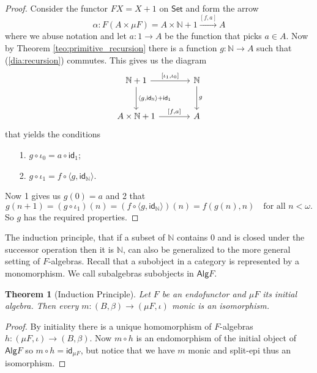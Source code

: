 \documentclass[letterpaper, 11pt, oneside]{memoir}
\theoremstyle{myteo}
\newtheorem{theorem}{Theorem}[section]
\numberwithin{equation}{section}
\newcommand{\id}{\textsf{id}}
\newcommand{\alg}{\textsf{Alg}}
\newcommand{\Set}{\textsf{Set}}
\newcommand{\N}{\mathbb{N}}
\newcommand{\outofcoprod}[2]{{[#1, #2]}}
\newcommand{\intoprod}[2]{{\langle #1, #2\rangle}}
\begin{document}
\begin{proof}
  Consider the functor \(FX = X + 1\) on \(\Set\) and form the arrow
  \begin{equation*}
    \alpha \colon F(A \times \mu F) = A \times \N + 1 \xrightarrow{\outofcoprod{f}{a}} A
  \end{equation*}
  where we abuse notation and let \(a : 1 \to A\) be the function that picks \(a \in A\).
  Now by Theorem \ref{teo:primitive_recursion} there is a function \(g \colon \N \to A\) such that (\ref{dia:recursion}) commutes.
  This gives us the diagram
  \begin{equation}
    \begin{tikzcd}[sep = large]
      \N + 1 \ar[r, "\outofcoprod{\iota_1}{\iota_0}"] \ar[d, "\intoprod{g}{\id_\N} + \id_1"] & \N \ar[d, "g"]\\
      A \times \N + 1 \ar[r, "\outofcoprod{f}{a}"] & A
    \end{tikzcd}
  \end{equation}
  that yields the conditions
  \begin{enumerate}
  \item[1.] \(g \circ \iota_0 = a \circ \id_1\);
  \item[2.] \(g \circ \iota_1 = f \circ \intoprod{g}{\id_\N}\).
  \end{enumerate}
  Now 1 gives us \(g(0) = a\) and 2 that
  \begin{equation*}
    g(n + 1) = (g \circ \iota_1)(n) = (f \circ \intoprod{g}{\id_\N})(n) = f(g(n), n) \quad \text{for all \(n < \omega\).}
  \end{equation*}
  So \(g\) has the required properties.
\end{proof}

The induction principle, that if a subset of \(\N\) contains \(0\) and is closed under the successor operation then it is \(\N\), can also be generalized to the more general setting of \(F\)-algebras.
Recall that a subobject in a category is represented by a monomorphism.
We call subalgebras subobjects in \(\alg F\).

\begin{theorem}[Induction Principle]
  Let \(F\) be an endofunctor and \(\mu F\) its initial algebra.
  Then every \(m \colon (B, \beta) \to (\mu F, \iota)\) monic is an isomorphism.
\end{theorem}

\begin{proof}
  By initiality there is a unique homomorphism of \(F\)-algebras \(h \colon (\mu F, \iota) \to (B, \beta)\).
  Now \(m \circ h\) is an endomorphism of the initial object of \(\alg F\) so \(m \circ h = \id_{\mu F}\), but notice that we have \(m\) monic and split-epi thus an isomorphism.
\end{proof}
\end{document}
